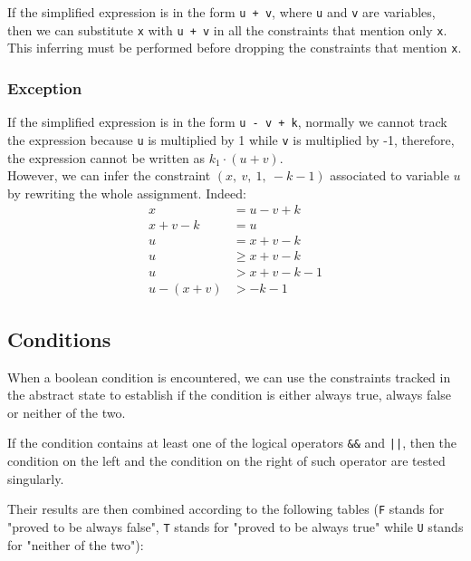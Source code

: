 \documentclass{article}
\newcounter{subsubsubsection}[subsubsection]
\newcommand{\spc}{\:}
\begin{document}
    
    
\label{assignment_prop}
If the simplified expression is in the form \texttt{u + v}, where \texttt{u} and \texttt{v} are variables, then we can substitute \texttt{x} with \texttt{u + v} in all the constraints that mention only \texttt{x}.
This inferring must be performed before dropping the constraints that mention \texttt{x}.


\subsubsection{Exception}
\label{exception}
If the simplified expression is in the form \texttt{u - v + k}, normally we cannot track the expression because \texttt{u} is multiplied by 1 while \texttt{v} is multiplied by -1, therefore, the expression cannot be written as $k_1\cdot(u+v)$.
\\
However, we can infer the constraint $(x,\spc v,\spc 1,\spc -k-1)$ associated to variable $u$ by rewriting the whole assignment. Indeed:
\begin{align*}
    x &= u - v + k\\
    x + v - k &= u\\
    u &= x + v - k\\
    u &\geq x + v - k\\
    u &> x + v - k - 1\\
    u - (x + v) &> -k - 1
\end{align*}



\subsection{Conditions}

When a boolean condition is encountered, we can use the constraints tracked in the abstract state to establish if the condition is either always true, always false or neither of the two.

If the condition contains at least one of the logical operators \texttt{\&\&} and \texttt{||}, then the condition on the left and the condition on the right of such operator are tested singularly.

Their results are then combined according to the following tables (\texttt{F} stands for "proved to be always false", \texttt{T} stands for "proved to be always true" while \texttt{U} stands for "neither of the two"):
\end{document}
